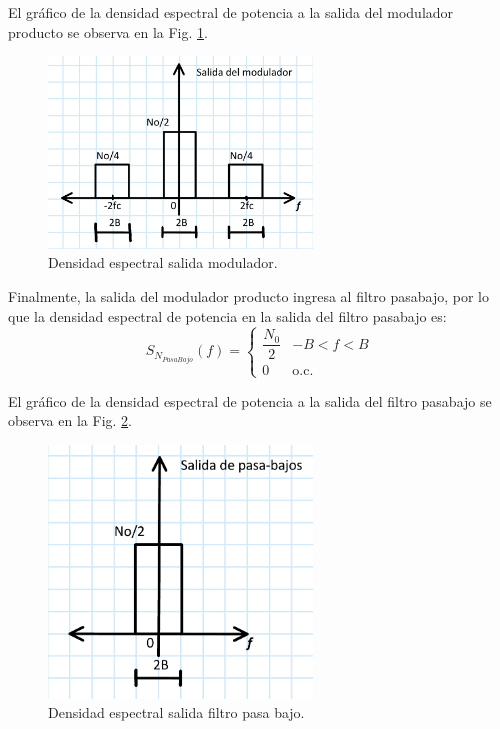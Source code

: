 	El gráfico de la densidad espectral de potencia a la salida del modulador producto se observa en la Fig. \ref{fig:6modulador}.


		\begin{figure}[H]
			\centering
			\includegraphics[width=7cm]{imagenes/Actividad_6/actividad6_modulador.jpg}
			\caption{Densidad espectral salida modulador.}
			\label{fig:6modulador}
		\end{figure}



	Finalmente, la salida del modulador producto ingresa al filtro pasabajo, por lo que la densidad espectral de potencia en 
	la salida del filtro pasabajo es:
		\[
				S_{N_{PasaBajo}}(f) =
				\begin{cases}
				\dfrac{N_0}{2} & -B < f < B \\[6pt]
				0 & \text{o.c.}
				\end{cases}
		\]

	El gráfico de la densidad espectral de potencia a la salida del filtro pasabajo se observa en la Fig. \ref{fig:6pasabajo}.
    
		\begin{figure}[H]
			\centering
			\includegraphics[width=7cm]{imagenes/Actividad_6/actividad6_pasabajo.jpg}
			\caption{Densidad espectral salida filtro pasa bajo.}
			\label{fig:6pasabajo}
		\end{figure}


